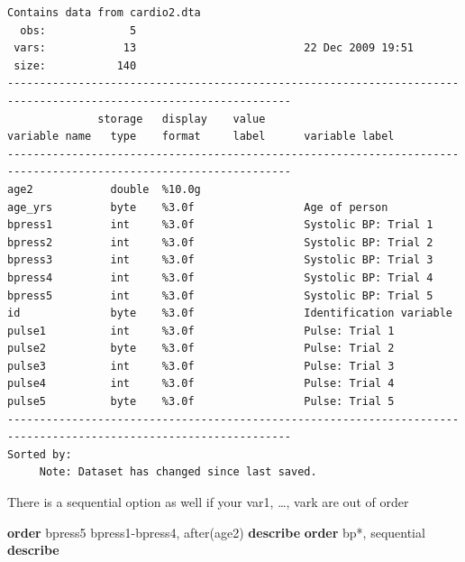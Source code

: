 \documentclass[
]{book}
\newenvironment{Shaded}{\begin{snugshade}}{\end{snugshade}}
\newcommand{\KeywordTok}[1]{\textcolor[rgb]{0.13,0.29,0.53}{\textbf{#1}}}
\newcommand{\NormalTok}[1]{#1}
\begin{document}
\begin{verbatim}
Contains data from cardio2.dta
  obs:             5                          
 vars:            13                          22 Dec 2009 19:51
 size:           140                          
------------------------------------------------------------------------------------------------------------------
              storage   display    value
variable name   type    format     label      variable label
------------------------------------------------------------------------------------------------------------------
age2            double  %10.0g                
age_yrs         byte    %3.0f                 Age of person
bpress1         int     %3.0f                 Systolic BP: Trial 1
bpress2         int     %3.0f                 Systolic BP: Trial 2
bpress3         int     %3.0f                 Systolic BP: Trial 3
bpress4         int     %3.0f                 Systolic BP: Trial 4
bpress5         int     %3.0f                 Systolic BP: Trial 5
id              byte    %3.0f                 Identification variable
pulse1          int     %3.0f                 Pulse: Trial 1
pulse2          byte    %3.0f                 Pulse: Trial 2
pulse3          int     %3.0f                 Pulse: Trial 3
pulse4          int     %3.0f                 Pulse: Trial 4
pulse5          byte    %3.0f                 Pulse: Trial 5
------------------------------------------------------------------------------------------------------------------
Sorted by: 
     Note: Dataset has changed since last saved.
\end{verbatim}

There is a sequential option as well if your var1, \ldots, vark are out of order

\begin{Shaded}
\begin{Highlighting}[]
\KeywordTok{order}\NormalTok{ bpress5 bpress1{-}bpress4, after(age2)}
\KeywordTok{describe}
\KeywordTok{order}\NormalTok{ bp*, sequential}
\KeywordTok{describe}
\end{Highlighting}
\end{Shaded}
\end{document}
